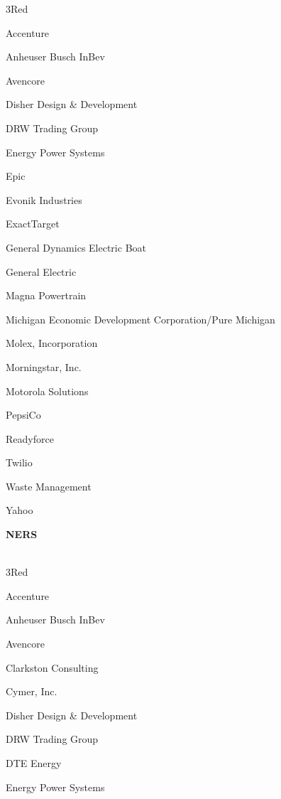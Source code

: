 \documentclass[twoside]{article}
\begin{document}
\begin{center}
\begin{multicols}{5}
\begin{FlushLeft}
        \begin{compactitem}
        \item 3Red
\item Accenture
\item Anheuser Busch InBev
\item Avencore
\item Disher Design \& Development
\item DRW Trading Group
\item Energy Power Systems
\item Epic
\item Evonik Industries
\item ExactTarget
\item General Dynamics Electric Boat
\item General Electric
\item Magna Powertrain
\item Michigan Economic Development Corporation/Pure Michigan
\item Molex, Incorporation
\item Morningstar, Inc.
\item Motorola Solutions
\item PepsiCo
\item Readyforce
\item Twilio
\item Waste Management
\item Yahoo
\end{compactitem}
        \end{FlushLeft}
        \vspace{1em}
        {\fontsize{14}{16}\selectfont \bf NERS}\\
        \vspace{-1em}
        ~\hrulefill~
        \vspace{-.9em}
        \begin{FlushLeft}
        \begin{compactitem}
        \item 3Red
\item Accenture
\item Anheuser Busch InBev
\item Avencore
\item Clarkston Consulting
\item Cymer, Inc.
\item Disher Design \& Development
\item DRW Trading Group
\item DTE Energy
\item Energy Power Systems

\end{compactitem}
\end{FlushLeft}
\end{multicols}
\end{center}
\end{document}
